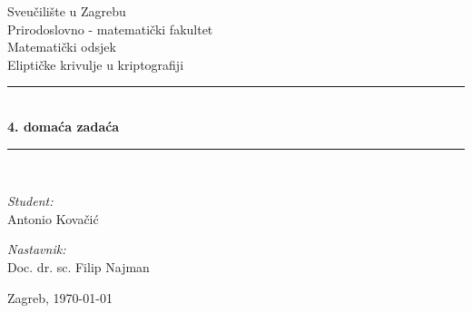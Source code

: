 \documentclass[12pt, a4paper]{article}
\newcommand{\HRule}{\rule{\linewidth}{0.5mm}}
\begin{document}
\renewcommand{\bibname}{Literatura}%
\begin{titlepage}
\begin{center}
\newtheorem{thm}{Teorem}[section] %
\theoremstyle{definition}
\newtheorem{defn}[thm]{Definicija} %
\newtheorem{exmp}[thm]{Primjer} %
\newtheorem{nap}[thm]{Napomena} %

\LARGE Sveučilište u Zagrebu \\[1cm] Prirodoslovno - matematički fakultet \\[1cm] Matematički odsjek\\[3cm]

\Large Eliptičke krivulje u kriptografiji \\[0.5cm]

\HRule \\[0.4cm]
{ \huge \bfseries 4. domaća zadaća}\\[0.4cm]

\HRule \\[9cm]

\begin{minipage}{0.4\textwidth}
\begin{flushleft} \large
\emph{Student:\\}
Antonio Kovačić
\end{flushleft}
\end{minipage}
\begin{minipage}{0.4\textwidth}
\begin{flushright} \large
\emph{Nastavnik:\\}
Doc. dr. sc. Filip Najman
\end{flushright}
\end{minipage}


\vfill

{\large Zagreb, \today}

\end{center}
\end{titlepage}
\pagestyle{plain} %
\setcounter{page}{1}
\begingroup
\let\cleardoublepage\relax
\tableofcontents

\newpage
\end{document}
